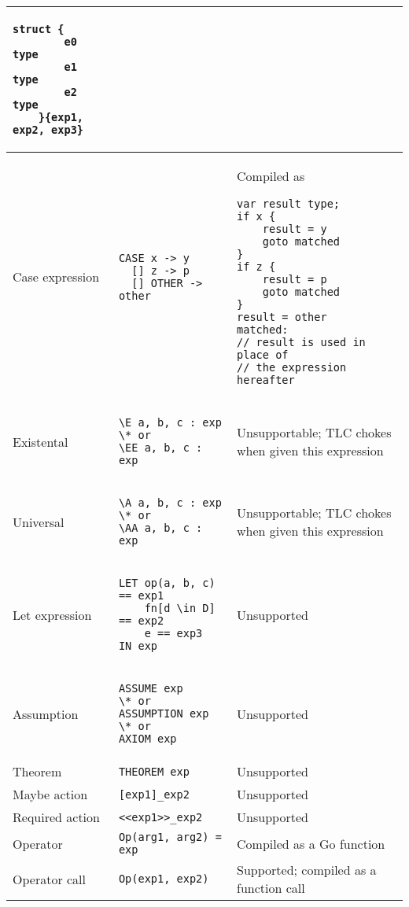 \begin{center}
\begin{longtable}{ || m{} | m{} | m{} || }
	\begin{lstlisting}[language=golang]
	struct {
		e0 type
		e1 type
		e2 type
	}{exp1, exp2, exp3}
	\end{lstlisting} \\
	\hline
	Case expression &
	\begin{lstlisting}[language=pcal]
CASE x -> y
  [] z -> p
  [] OTHER -> other
	\end{lstlisting} &
	Compiled as
	\begin{lstlisting}[language=golang]
var result type;
if x {
	result = y
	goto matched
}
if z {
	result = p
	goto matched
}
result = other
matched:
// result is used in place of
// the expression hereafter
	\end{lstlisting} \\
	\hline
	Existental &
	\begin{lstlisting}[language=pcal]
\E a, b, c : exp
\* or
\EE a, b, c : exp
	\end{lstlisting} &
	Unsupportable; TLC chokes when given this expression \\
	\hline
	Universal &
	\begin{lstlisting}[language=pcal]
\A a, b, c : exp
\* or
\AA a, b, c : exp
	\end{lstlisting} &
	Unsupportable; TLC chokes when given this expression \\
	\hline
	Let expression &
	\begin{lstlisting}[language=pcal]
LET op(a, b, c) == exp1
    fn[d \in D] == exp2
    e == exp3
IN exp
	\end{lstlisting} &
	Unsupported \\
	\hline
	Assumption &
	\begin{lstlisting}[language=pcal]
ASSUME exp
\* or
ASSUMPTION exp
\* or
AXIOM exp
	\end{lstlisting} &
	Unsupported \\
	\hline
	Theorem & \lstinline[language=pcal]|THEOREM exp| & Unsupported \\
	\hline
	Maybe action & \lstinline[language=pcal]|[exp1]_exp2| &
	Unsupported \\
	\hline
	Required action & \lstinline[language=pcal]|<<exp1>>_exp2| & Unsupported \\
	\hline
	Operator & \lstinline[language=pcal]|Op(arg1, arg2) = exp| & Compiled as a Go function \\
	\hline
	Operator call & \lstinline[language=pcal]|Op(exp1, exp2)| & Supported; compiled as a function call \\
	\hline

\end{longtable}
\end{center}
